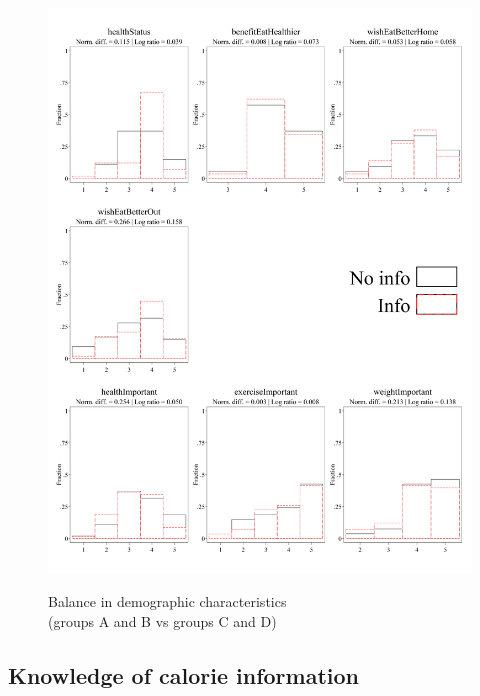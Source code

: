 \documentclass[12pt]{article}
\begin{document}
\begin{figure}[ht]
  \caption{Balance in demographic characteristics \\ (groups A and B vs groups C and D)}\label{fig:group2_health}
  \begin{center}
  {\includegraphics[width=1\textwidth]{./figures/covDifTreat_0_health.png}}
  \end{center}
\end{figure}

\FloatBarrier

\clearpage

\subsection{Knowledge of calorie information}
\end{document}
